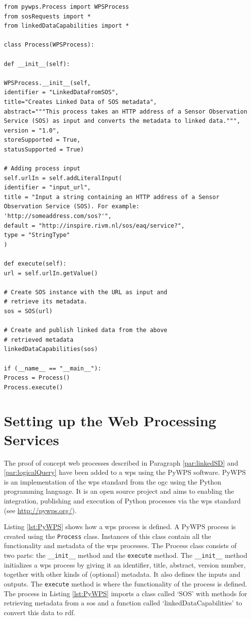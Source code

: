 \begin{lstlisting}[float,caption={Script that defines a web proces using PyWPS}, label={lst:PyWPS}]
from pywps.Process import WPSProcess
from sosRequests import *
from linkedDataCapabilities import *

class Process(WPSProcess):

def __init__(self):

WPSProcess.__init__(self,
identifier = "LinkedDataFromSOS",
title="Creates Linked Data of SOS metadata",
abstract="""This process takes an HTTP address of a Sensor Observation Service (SOS) as input and converts the metadata to linked data.""",
version = "1.0",
storeSupported = True,
statusSupported = True)

# Adding process input
self.urlIn = self.addLiteralInput(
identifier = "input_url", 
title = "Input a string containing an HTTP address of a Sensor Observation Service (SOS). For example: 'http://someaddress.com/sos?'", 
default = "http://inspire.rivm.nl/sos/eaq/service?", 
type = "StringType"
)

def execute(self):
url = self.urlIn.getValue()

# Create SOS instance with the URL as input and 
# retrieve its metadata.  
sos = SOS(url)

# Create and publish linked data from the above 
# retrieved metadata
linkedDataCapabilities(sos)

if (__name__ == "__main__"):
Process = Process()
Process.execute()
\end{lstlisting}

\section{Setting up the Web Processing Services}
\label{impl:wps}

The proof of concept web processes described in Paragraph \ref{par:linkedSD} and \ref{par:logicalQuery} have been added to a \ac{wps} using the PyWPS software. PyWPS is an implementation of the \acl{wps} standard from the \acl{ogc} using the Python programming language. It is an open source project and aims to enabling the integration, publishing and execution of Python processes via the \ac{wps} standard (see \url{http://pywps.org/}).  

Listing \ref{lst:PyWPS} shows how a \ac{wps} process is defined. A PyWPS process is created using the \texttt{Process} class. Instances of this class contain all the functionality and metadata of the \ac{wps} processes. The Process class consists of two parts: the \texttt{\_\_init\_\_} method and the \texttt{execute} method. The \texttt{\_\_init\_\_} method initializes a \ac{wps} process by giving it an identifier, title, abstract, version number, together with other kinds of (optional) metadata. It also defines the inputs and outputs. The \texttt{execute} method is where the functionality of the process is defined. The process in Listing \ref{lst:PyWPS} imports a class called `SOS' with methods for retrieving metadata from a \acl{sos} and a function called `linkedDataCapabilities' to convert this data to \ac{rdf}.

